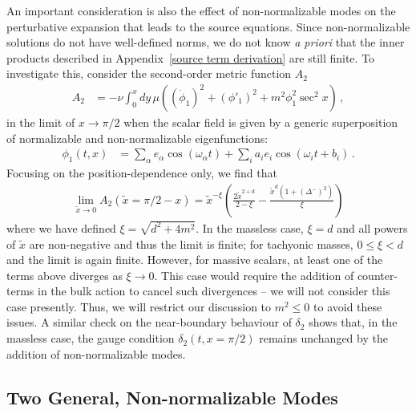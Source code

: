 \documentclass[letterpaper,11pt]{article}
\begin{document}
An important consideration is also the effect of non-normalizable modes on the perturbative expansion that leads to the source equations. Since non-normalizable solutions do not have well-defined norms, we do not know \emph{a priori} that the inner products described in Appendix~\ref{source term derivation} are still finite. To investigate this, consider the second-order metric function $A_2$
\begin{align}
A_2 &= - \nu \int^x_0 dy \, \mu \left( (\dot \phi_1)^2 + (\phi'_1)^2 + m^2 \phi_1^2 \sec^2 x \right) \, ,
\end{align}
in the limit of $x \to \pi/2$ when the scalar field is given by a generic superposition of normalizable and non-normalizable eigenfunctions:
\begin{align}
\phi_1 (t, x) &= \sum_\alpha e_\alpha \cos (\omega_\alpha t ) + \sum_i a_i e_i \cos (\omega_i t + b_i) \, .
\end{align}
Focusing on the position-dependence only, we find that
\begin{align}
\lim_{\tilde x \to 0} A_2 (\tilde x = \pi /2 - x) = \tilde{x}^{-\xi} \left( \frac{2 \tilde{x}^{2+d}}{2 - \xi} - \frac{\tilde{x}^d (1 + \left(\Delta^{-}\right)^2)}{\xi} \right)
\end{align}
where we have defined $\xi = \sqrt{d^2 + 4m^2}$. In the massless case, $\xi = d$ and all powers of $\tilde{x}$ are non-negative and thus the limit is finite; for tachyonic masses, $0 \leq \xi < d$ and the limit is again finite. However, for massive scalars, at least one of the terms above diverges as $\xi \to 0$. This case would require the addition of counter-terms in the bulk action to cancel such divergences -- we will not consider this case presently. Thus, we will restrict our discussion to $m^2 \leq 0$ to avoid these issues. A similar check on the near-boundary behaviour of $\delta_2$ shows that, in the massless case, the gauge condition $\delta_2 (t, x=\pi/2)$ remains unchanged by the addition of non-normalizable modes.

\subsection{Two General, Non-normalizable Modes}
\end{document}
